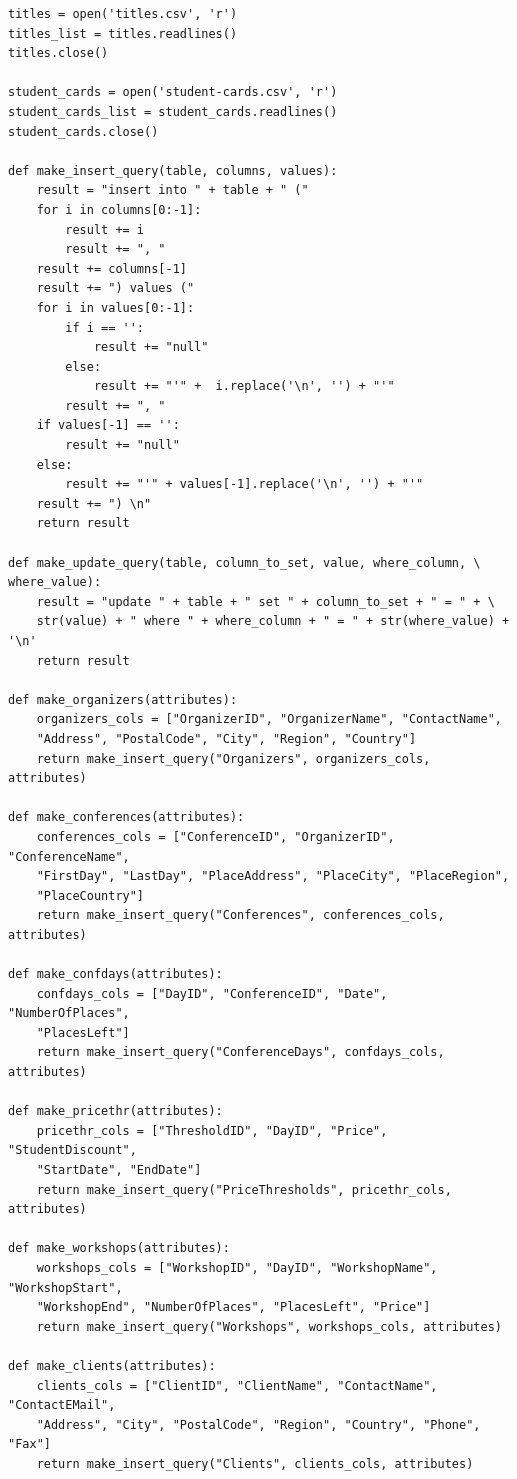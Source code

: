 \documentclass[12pt, a4paper]{mwrep}
\begin{document}
\begin{lstlisting}
titles = open('titles.csv', 'r')
titles_list = titles.readlines()
titles.close()

student_cards = open('student-cards.csv', 'r')
student_cards_list = student_cards.readlines()
student_cards.close()

def make_insert_query(table, columns, values):
    result = "insert into " + table + " ("
    for i in columns[0:-1]:
        result += i     
        result += ", "
    result += columns[-1]
    result += ") values ("
    for i in values[0:-1]:
        if i == '':
            result += "null"
        else:
            result += "'" +  i.replace('\n', '') + "'"
        result += ", "
    if values[-1] == '':
        result += "null"
    else:
        result += "'" + values[-1].replace('\n', '') + "'"
    result += ") \n"
    return result

def make_update_query(table, column_to_set, value, where_column, \
where_value):
    result = "update " + table + " set " + column_to_set + " = " + \
    str(value) + " where " + where_column + " = " + str(where_value) + '\n'
    return result

def make_organizers(attributes):
    organizers_cols = ["OrganizerID", "OrganizerName", "ContactName", 
    "Address", "PostalCode", "City", "Region", "Country"]
    return make_insert_query("Organizers", organizers_cols, attributes)
    
def make_conferences(attributes):
    conferences_cols = ["ConferenceID", "OrganizerID", "ConferenceName", 
    "FirstDay", "LastDay", "PlaceAddress", "PlaceCity", "PlaceRegion", 
    "PlaceCountry"]
    return make_insert_query("Conferences", conferences_cols, attributes)

def make_confdays(attributes):
    confdays_cols = ["DayID", "ConferenceID", "Date", "NumberOfPlaces", 
    "PlacesLeft"]
    return make_insert_query("ConferenceDays", confdays_cols, attributes)

def make_pricethr(attributes):
    pricethr_cols = ["ThresholdID", "DayID", "Price", "StudentDiscount", 
    "StartDate", "EndDate"]
    return make_insert_query("PriceThresholds", pricethr_cols, attributes)

def make_workshops(attributes):
    workshops_cols = ["WorkshopID", "DayID", "WorkshopName", "WorkshopStart",
    "WorkshopEnd", "NumberOfPlaces", "PlacesLeft", "Price"]
    return make_insert_query("Workshops", workshops_cols, attributes)

def make_clients(attributes):
    clients_cols = ["ClientID", "ClientName", "ContactName", "ContactEMail", 
    "Address", "City", "PostalCode", "Region", "Country", "Phone", "Fax"]
    return make_insert_query("Clients", clients_cols, attributes)


\end{lstlisting}
\end{document}

